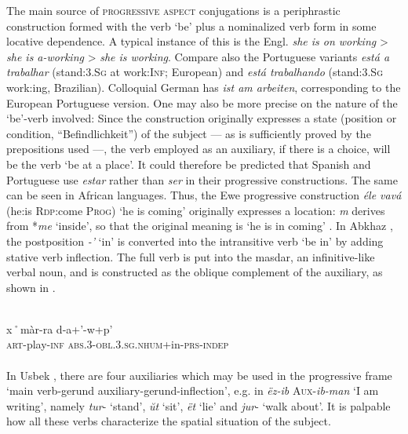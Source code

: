 \label{page33}The main source of \textsc{progressive aspect} conjugations is a periphrastic construction formed with the verb ‘be’ plus  a nominalized verb form in some locative dependence. A typical instance of this is the Engl. \textit{she is on working} {\textgreater} \textit{she is a-working} {\textgreater} \textit{she is working}. Compare also the Portuguese variants \textit{está a trabalhar} (stand:3.\textsc{Sg} at work:\textsc{Inf}; European) and \textit{está trabalhando} (stand:3.\textsc{Sg} work:ing, Brazilian). Colloquial German has \textit{ist am arbeiten}, corresponding to the European Portuguese version. One may also be more precise on the nature of the ‘be’-verb involved: Since the construction originally expresses a state (position or condition, ``Befindlichkeit'') of the subject — as is sufficiently proved by the prepositions used —, the verb employed as an auxiliary, if there is a choice, will be the verb ‘be at a place’. It could therefore be predicted that Spanish and Portuguese use \textit{estar} rather than \textit{ser} in their progressive constructions. The same can be seen in African languages. Thus, the Ewe progressive construction \textit{éle vavá }(he:is \textsc{Rdp}:come \textsc{Prog}) ‘he is coming’ originally expresses a location: \textit{m} derives from *\textit{me} ‘inside’, so that the original meaning is ‘he is in coming’ \citep[105f]{Heine1980}. In Abkhaz \citep[128, 181f]{Hewitt1979}, the postposition \textit{{}-'} ‘in’ is converted into the intransitive verb ‘be in’ by adding stative verb inflection. The full verb is put into the masdar, an infinitive-like verbal noun, and is constructed as the oblique complement of the auxiliary, as shown in .

\ea\label{ex:E3} 
\\
 \gll {}x˚màr-ra  d-a+'-w+p'\\
\textsc{art}-play-\textsc{inf}  \textsc{abs}.3-\textsc{obl}.3.\textsc{sg}.\textsc{nhum}+in-\textsc{prs}-\textsc{indep}\\
\\
\z
\noindent In Usbek \citep[86]{Žirmunskij1966}, there are four auxiliaries which may be used in the progressive frame ‘main verb-gerund auxiliary-gerund-inflection’, e.g. in \textit{ëz-ib} \textsc{Aux}{}-\textit{ib-man} ‘I am writing’, namely \textit{tur}{}- ‘stand’, \textit{\u{u}t} ‘sit’, \textit{ët }‘lie’ and \textit{jur}{}- ‘walk about’. It is palpable how all these verbs characterize the spatial situation of the subject.

